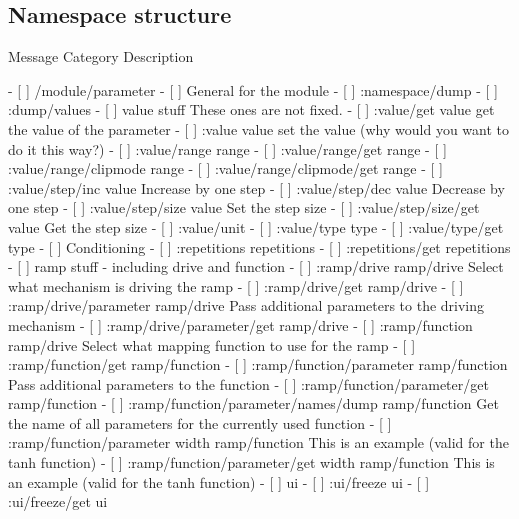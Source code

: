 \documentclass{sig-alternate}
\begin{document}
\subsection{Namespace structure}



		Message                                               Category       Description

		- [ ] /module/parameter
		    - [ ] General for the module
		        - [ ] :namespace/dump
		        - [ ] :dump/values
		    - [ ] value stuff                                                These ones are not fixed.
		        - [ ] :value/get                              value          get the value of the parameter
		        - [ ] :value                                  value          set the value (why would you want to do it this way?)
		        - [ ] :value/range                            range
		        - [ ] :value/range/get                        range
		        - [ ] :value/range/clipmode                   range
		        - [ ] :value/range/clipmode/get               range
		        - [ ] :value/step/inc                         value          Increase by one step
		        - [ ] :value/step/dec                         value          Decrease by one step
		        - [ ] :value/step/size                        value          Set the step size
		        - [ ] :value/step/size/get                    value          Get the step size
		        - [ ] :value/unit
		        - [ ] :value/type                             type
		        - [ ] :value/type/get                         type
		    - [ ] Conditioning
		        - [ ] :repetitions                            repetitions
		        - [ ] :repetitions/get                        repetitions
		    - [ ] ramp stuff - including drive and function
		        - [ ] :ramp/drive                             ramp/drive     Select what mechanism is driving the ramp
		        - [ ] :ramp/drive/get                         ramp/drive
		        - [ ] :ramp/drive/parameter                   ramp/drive     Pass additional parameters to the driving mechanism
		        - [ ] :ramp/drive/parameter/get               ramp/drive
		        - [ ] :ramp/function                          ramp/drive     Select what mapping function to use for the ramp
		        - [ ] :ramp/function/get                      ramp/function
		        - [ ] :ramp/function/parameter                ramp/function  Pass additional parameters to the function
		        - [ ] :ramp/function/parameter/get            ramp/function
		        - [ ] :ramp/function/parameter/names/dump     ramp/function  Get the name of all parameters for the currently used function
		        - [ ] :ramp/function/parameter width          ramp/function  This is an example (valid for the tanh function)
		        - [ ] :ramp/function/parameter/get width      ramp/function  This is an example (valid for the tanh function)
		    - [ ] ui
		        - [ ] :ui/freeze                              ui
		        - [ ] :ui/freeze/get                          ui
\end{document}
